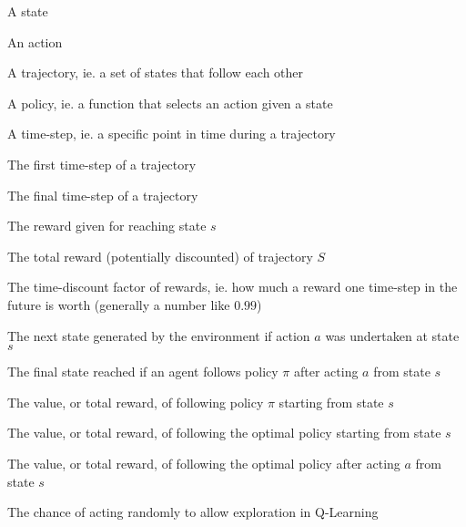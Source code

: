 \begin{description}[style=sameline,leftmargin=3cm,font=\normalfont]
  \item[$s$] A state\\
  \item[$a$] An action\\
  \item[$S$] A trajectory, ie. a set of states that follow each other\\
  \item[$\pi$] A policy, ie. a function that selects an action given a state\\
  \item[$t$] A time-step, ie. a specific point in time during a trajectory\\
  \item[$t_0$] The first time-step of a trajectory\\
  \item[$t_{end}$] The final time-step of a trajectory\\
  \item[$r(s)$] The reward given for reaching state $s$\\
  \item[$R(S)$] The total reward (potentially discounted) of trajectory $S$\\
  \item[$\gamma$] The time-discount factor of rewards, ie. how much a reward one time-step in the future is worth (generally a number like $0.99$)\\
  \item[$Env(s, a)$] The next state generated by the environment if action $a$ was undertaken at state $s$\\
  \item[$Term_{\pi}(s, a)$] The final state reached if an agent follows policy $\pi$ after acting $a$ from state $s$\\
  \item[$V_{\pi}(s)$] The value, or total reward, of following policy $\pi$ starting from state $s$\\
  \item[$V^*(s)$] The value, or total reward, of following the optimal policy starting from state $s$\\
  \item[$Q^*(s, a)$] The value, or total reward, of following the optimal policy after acting $a$ from state $s$\\
  \item[$\epsilon$] The chance of acting randomly to allow exploration in Q-Learning\\

\end{description}
